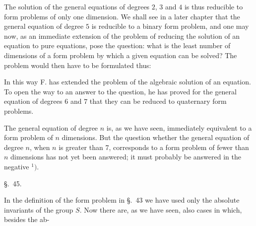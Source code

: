 The solution of the general equations of degrees $2$, $3$ and
$4$ is thus reducible to form problems of only one dimension. We shall see in a later chapter
that the general equation of degree $5$ is reducible to a binary
form problem, and one may now, as an
immediate extension of the problem of reducing the solution of an
equation to pure equations, pose the question:
what is the least number of dimensions of a form problem by which a given equation can be solved?
The problem would then have to be formulated thus:


In this way F.  has extended the problem of the algebraic
solution of an equation. To open the way to an answer to the question, he has proved for the general equation
of degrees $6$ and $7$ that they can be reduced to quaternary form problems.

The general equation of degree $n$ is, as we have seen,
immediately equivalent to a form problem of $n$ dimensions.
But the question whether the general equation of degree $n$,
when $n$ is greater than 7, corresponds to a form problem of
fewer than $n$ dimensions has not yet been answered; it must probably be answered in the negative $^{1})$.

\begingroup
\renewcommand{\thefootnote}{1)}
\endgroup

\begin{center}
\S.\ 45.

\end{center}

In the definition of the form problem in \S.\ 43 we have
used only the absolute invariants of the group $S$. Now there
are, as we have seen, also cases in which, besides the ab-

